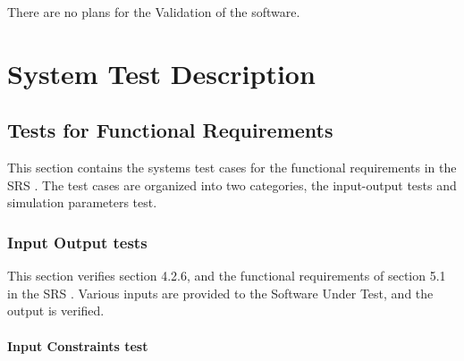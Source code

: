 \documentclass[12pt, titlepage]{article}
\begin{document}
There are no plans for the Validation of the \progname{} software.

\section{System Test Description} \label{sec_systems_tests}
	
\subsection{Tests for Functional Requirements}


This section contains the systems test cases for the functional requirements in the
SRS \cite{SRS}. The test cases are organized into two categories, the input-output 
tests and simulation parameters test.


\subsubsection{Input Output tests}

  
This section verifies section 4.2.6, and the functional requirements of section 5.1
in the SRS \cite {SRS}. Various inputs are provided to the Software Under Test, 
and the output is verified. 
		
\paragraph{Input Constraints test}
\end{document}
